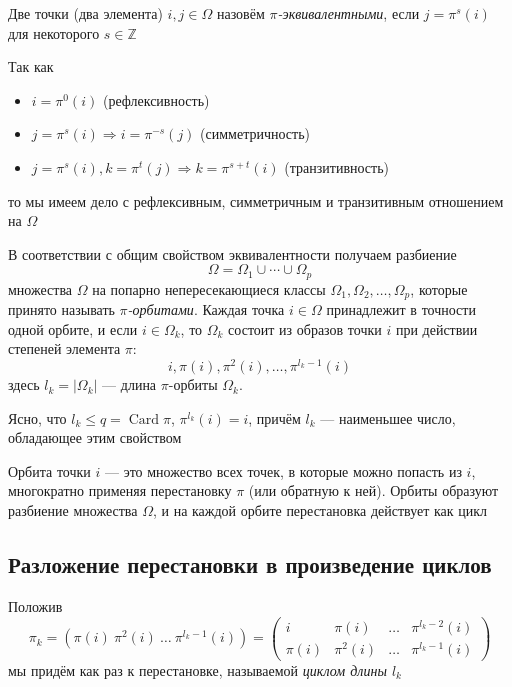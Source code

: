 \documentclass[a4paper,12pt]{article}
\theoremstyle{definition}
\theoremstyle{plain}
\theoremstyle{remark}
\begin{document}
	Две точки (два элемента) $i, j \in \Omega$ назовём \textit{$\pi$-эквивалентными}, если $j = \pi^s(i)$ для некоторого $s \in \mathbb{Z}$
	
	Так как
	\begin{itemize}
		\item $i = \pi^0(i)$ (рефлексивность)
		\item $j = \pi^s(i) \Rightarrow i = \pi^{-s}(j)$ (симметричность)
		\item $j = \pi^s(i), k = \pi^t(j) \Rightarrow k = \pi^{s+t}(i)$ (транзитивность)
	\end{itemize}
	то мы имеем дело с рефлексивным, симметричным и транзитивным отношением на $\Omega$
	
	В соответствии с общим свойством эквивалентности получаем разбиение
	\[
	\Omega = \Omega_1 \cup \cdots \cup \Omega_p \tag{1}
	\]
	множества $\Omega$ на попарно непересекающиеся классы $\Omega_1, \Omega_2, \dots, \Omega_p$, которые принято называть \textit{$\pi$-орбитами}. Каждая точка $i \in \Omega$ принадлежит в точности одной орбите, и если $i \in \Omega_k$, то $\Omega_k$ состоит из образов точки $i$ при действии степеней элемента $\pi$:
	\[
	i, \pi(i), \pi^2(i), \dots, \pi^{l_k-1}(i)
	\]
	здесь $l_k = |\Omega_k|$ — длина $\pi$-орбиты $\Omega_k$.
	
	Ясно, что $l_k \leq q = \operatorname{Card} \pi$, $\pi^{l_k}(i) = i$, причём $l_k$ — наименьшее число, обладающее этим свойством
	
	\begin{tcolorbox}[colback=green!5, colframe=green!50!black, title=Пояснение]
		Орбита точки $i$ — это множество всех точек, в которые можно попасть из $i$, многократно применяя перестановку $\pi$ (или обратную к ней). Орбиты образуют разбиение множества $\Omega$, и на каждой орбите перестановка действует как цикл
	\end{tcolorbox}
	
	\subsection{Разложение перестановки в произведение циклов}
	
	Положив
	\[
	\pi_k = (\pi(i) \ \pi^2(i) \ \dots \ \pi^{l_k-1}(i)) = \begin{pmatrix}
		i & \pi(i) & \dots & \pi^{l_k-2}(i) \\
		\pi(i) & \pi^2(i) & \dots & \pi^{l_k-1}(i)
	\end{pmatrix}
	\]
	мы придём как раз к перестановке, называемой \textit{циклом длины $l_k$}
	
\end{document}
